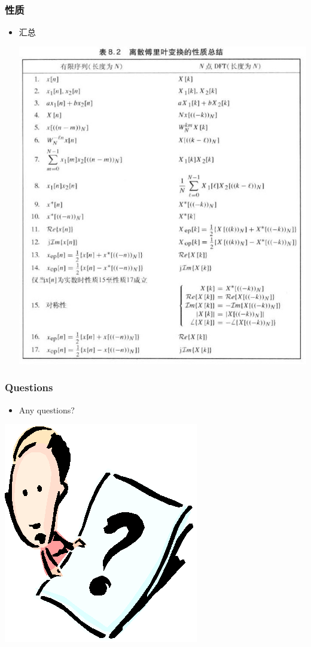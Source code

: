 \documentclass[CJKutf8,xcolor=pdftex,dvipsnames,table]{beamer}
\begin{document}
\begin{CJK*}{UTF8}{song}
  \begin{frame}
    \frametitle{性质}
    \begin{itemize}
    \item 汇总
  		\begin{center}
   		\includegraphics[scale=.27]{dtsp-c-t8-2}
   		\end{center}    
	\end{itemize}
  \end{frame} 
        
  \begin{frame}
    \frametitle{Questions}
    \begin{itemize}
    \item Any questions?
    \end{itemize}
    \begin{center}
      \includegraphics[scale=.5]{question}
    \end{center}
  \end{frame}  
        

\end{CJK*}
\end{document}
